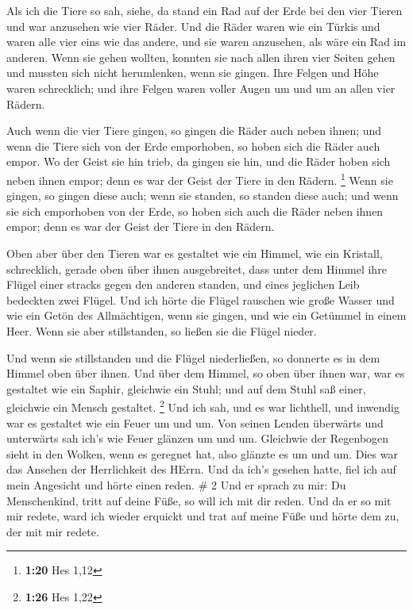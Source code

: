  Als ich die Tiere so sah, siehe, da stand ein Rad auf der
Erde bei den vier Tieren und war anzusehen wie vier Räder. 
Und die Räder waren wie ein Türkis und waren alle vier eins wie das
andere, und sie waren anzusehen, als wäre ein Rad im anderen.
 Wenn sie gehen wollten, konnten sie nach allen ihren vier
Seiten gehen und mussten sich nicht herumlenken, wenn sie gingen.
 Ihre Felgen und Höhe waren schrecklich; und ihre Felgen
waren voller Augen um und um an allen vier Rädern.

 Auch wenn die vier Tiere gingen, so gingen die Räder auch
neben ihnen; und wenn die Tiere sich von der Erde emporhoben, so hoben
sich die Räder auch empor.  Wo der Geist sie hin trieb, da
gingen sie hin, und die Räder hoben sich neben ihnen empor; denn es war
der Geist der Tiere in den Rädern. \footnote{\textbf{1:20} Hes 1,12}
 Wenn sie gingen, so gingen diese auch; wenn sie standen,
so standen diese auch; und wenn sie sich emporhoben von der Erde, so
hoben sich auch die Räder neben ihnen empor; denn es war der Geist der
Tiere in den Rädern.

 Oben aber über den Tieren war es gestaltet wie ein Himmel,
wie ein Kristall, schrecklich, gerade oben über ihnen ausgebreitet,
 dass unter dem Himmel ihre Flügel einer stracks gegen den
anderen standen, und eines jeglichen Leib bedeckten zwei Flügel.
 Und ich hörte die Flügel rauschen wie große Wasser und wie
ein Getön des Allmächtigen, wenn sie gingen, und wie ein Getümmel in
einem Heer. Wenn sie aber stillstanden, so ließen sie die Flügel nieder.

 Und wenn sie stillstanden und die Flügel niederließen, so
donnerte es in dem Himmel oben über ihnen.  Und über dem
Himmel, so oben über ihnen war, war es gestaltet wie ein Saphir,
gleichwie ein Stuhl; und auf dem Stuhl saß einer, gleichwie ein Mensch
gestaltet. \footnote{\textbf{1:26} Hes 1,22}  Und ich sah,
und es war lichthell, und inwendig war es gestaltet wie ein Feuer um und
um. Von seinen Lenden überwärts und unterwärts sah ich's wie Feuer
glänzen um und um.  Gleichwie der Regenbogen sieht in den
Wolken, wenn es geregnet hat, also glänzte es um und um. Dies war das
Ansehen der Herrlichkeit des HErrn. Und da ich's gesehen hatte, fiel ich
auf mein Angesicht und hörte einen reden. \# 2  Und er
sprach zu mir: Du Menschenkind, tritt auf deine Füße, so will ich mit
dir reden.  Und da er so mit mir redete, ward ich wieder
erquickt und trat auf meine Füße und hörte dem zu, der mit mir redete.


